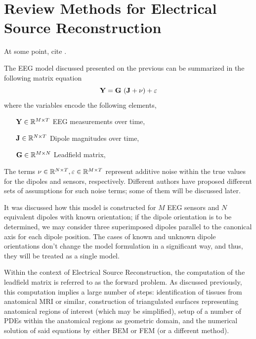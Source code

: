 \chapter{Review Methods for Electrical Source Reconstruction}



\label{ch:review}

At some point, cite \cite{grech2008review}.

The EEG model discussed presented on the previous can be summarized in the following matrix equation
\begin{equation}
\mathbf{Y} = \mathbf{G}\, \left(  \mathbf{J} + \nu  \right) + \varepsilon
\label{eq:general}
\end{equation}
where the variables encode the following elements,
\begin{itemize}
\item[$\mathbf{Y} \in \mathbb{R}^{M\times T}$] EEG measurements over time,
\item[$\mathbf{J} \in \mathbb{R}^{N\times T}$] Dipole magnitudes over time,
\item[$\mathbf{G} \in \mathbb{R}^{M\times N}$] Leadfield matrix,
\end{itemize}
%
The terms $\nu \in \mathbb{R}^{N\times T}, \varepsilon\in\mathbb{R}^{M\times T}$ represent additive noise within the true values for the dipoles and sensors, respectively. 
%
Different authors have proposed different sets of assumptions for such noise terms; some of them will be discussed later.

It was discussed how this model is constructed for $M$ EEG sensors and $N$ equivalent dipoles with known orientation; if the dipole orientation is to be determined, we may consider three superimposed dipoles parallel to the canonical axis for each dipole position.
%
The cases of known and unknown dipole orientations don't change the model formulation in a significant way, and thus, they will be treated as a single model.

Within the context of Electrical Source Reconstruction, the computation of the leadfield matrix is referred to as the forward problem.
%
As discussed previously, this computation implies a large number of steps: identification of tissues from anatomical MRI or similar, construction of triangulated surfaces representing anatomical regions of interest (which may be simplified), setup of a number of PDEs within the anatomical regions as geometric domain, and the numerical solution of said equations by either BEM or FEM (or a different method).

